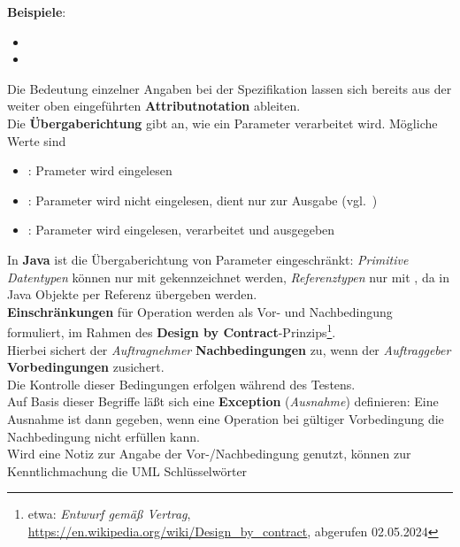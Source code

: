 \noindent
\textbf{Beispiele}:

\begin{itemize}
    \item[] 
    \item[] 
\end{itemize}

\noindent
Die Bedeutung einzelner Angaben bei der Spezifikation lassen sich bereits aus der weiter oben eingeführten \textbf{Attributnotation} ableiten.\\
Die \textbf{Übergaberichtung} gibt an, wie ein Parameter verarbeitet wird.
Mögliche Werte sind

\begin{itemize}
    \item {}: Prameter wird eingelesen
    \item {}: Parameter wird nicht eingelesen, dient nur zur Ausgabe (vgl.~\cite[24]{Buh09})
    \item {}: Parameter wird eingelesen, verarbeitet und ausgegeben
\end{itemize}

\noindent
In \textbf{Java} ist die Übergaberichtung von Parameter eingeschränkt: \textit{Primitive Datentypen} können nur mit  gekennzeichnet werden, \textit{Referenztypen} nur mit , da in Java Objekte per Referenz übergeben werden.\\

\noindent
\textbf{Einschränkungen} für Operation werden als Vor- und Nachbedingung formuliert, im Rahmen des \textbf{Design by Contract}-Prinzips\footnote{
etwa: \textit{Entwurf gemäß Vertrag}, \url{https://en.wikipedia.org/wiki/Design_by_contract}, abgerufen 02.05.2024
}.\\
Hierbei sichert der \textit{Auftragnehmer} \textbf{Nachbedingungen} zu, wenn der \textit{Auftraggeber} \textbf{Vorbedingungen} zusichert.\\
Die Kontrolle dieser Bedingungen erfolgen während des Testens.\\
Auf Basis dieser Begriffe läßt sich eine \textbf{Exception} (\textit{Ausnahme}) definieren: Eine Ausnahme ist dann gegeben, wenn eine Operation bei gültiger Vorbedingung die Nachbedingung nicht erfüllen kann.\\

\noindent
Wird eine Notiz zur Angabe der Vor-/Nachbedingung genutzt, können zur Kenntlichmachung die UML Schlüsselwörter

